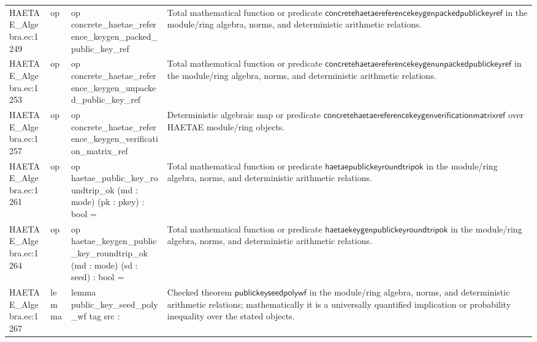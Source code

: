 \documentclass[10pt]{article}
\begin{document}
\begin{longtable}{L{0.11\textwidth}L{0.055\textwidth}L{0.385\textwidth}L{0.41\textwidth}}
HAETAE\_\allowbreak{}Algebra.\allowbreak{}ec:\allowbreak{}1249 & op & {\ttfamily\scriptsize op concrete\_\allowbreak{}haetae\_\allowbreak{}reference\_\allowbreak{}keygen\_\allowbreak{}packed\_\allowbreak{}public\_\allowbreak{}key\_\allowbreak{}ref} & Total mathematical function or predicate $\mathsf{concretehaetaereferencekeygenpackedpublickeyref}$ in the module/ring algebra, norms, and deterministic arithmetic relations. \\
HAETAE\_\allowbreak{}Algebra.\allowbreak{}ec:\allowbreak{}1253 & op & {\ttfamily\scriptsize op concrete\_\allowbreak{}haetae\_\allowbreak{}reference\_\allowbreak{}keygen\_\allowbreak{}unpacked\_\allowbreak{}public\_\allowbreak{}key\_\allowbreak{}ref} & Total mathematical function or predicate $\mathsf{concretehaetaereferencekeygenunpackedpublickeyref}$ in the module/ring algebra, norms, and deterministic arithmetic relations. \\
HAETAE\_\allowbreak{}Algebra.\allowbreak{}ec:\allowbreak{}1257 & op & {\ttfamily\scriptsize op concrete\_\allowbreak{}haetae\_\allowbreak{}reference\_\allowbreak{}keygen\_\allowbreak{}verification\_\allowbreak{}matrix\_\allowbreak{}ref} & Deterministic algebraic map or predicate $\mathsf{concretehaetaereferencekeygenverificationmatrixref}$ over HAETAE module/ring objects. \\
HAETAE\_\allowbreak{}Algebra.\allowbreak{}ec:\allowbreak{}1261 & op & {\ttfamily\scriptsize op haetae\_\allowbreak{}public\_\allowbreak{}key\_\allowbreak{}roundtrip\_\allowbreak{}ok (md : mode) (pk : pkey) : bool =} & Total mathematical function or predicate $\mathsf{haetaepublickeyroundtripok}$ in the module/ring algebra, norms, and deterministic arithmetic relations. \\
HAETAE\_\allowbreak{}Algebra.\allowbreak{}ec:\allowbreak{}1264 & op & {\ttfamily\scriptsize op haetae\_\allowbreak{}keygen\_\allowbreak{}public\_\allowbreak{}key\_\allowbreak{}roundtrip\_\allowbreak{}ok (md : mode) (sd : seed) : bool =} & Total mathematical function or predicate $\mathsf{haetaekeygenpublickeyroundtripok}$ in the module/ring algebra, norms, and deterministic arithmetic relations. \\
HAETAE\_\allowbreak{}Algebra.\allowbreak{}ec:\allowbreak{}1267 & lemma & {\ttfamily\scriptsize lemma public\_\allowbreak{}key\_\allowbreak{}seed\_\allowbreak{}poly\_\allowbreak{}wf tag src :} & Checked theorem $\mathsf{publickeyseedpolywf}$ in the module/ring algebra, norms, and deterministic arithmetic relations; mathematically it is a universally quantified implication or probability inequality over the stated objects. \\

\end{longtable}
\end{document}
